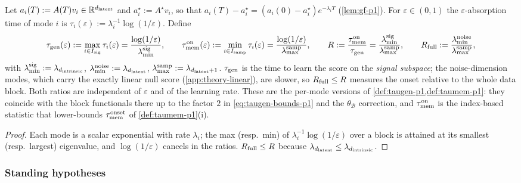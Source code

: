 \begin{definition}\label{def:abs-times-buf}
Let $a_i(T):=A(T)v_i\in\mathbb{R}^{d_{\mathrm{latent}}}$ and $a_i^\star:=A^\star v_i$, so that $a_i(T)-a_i^\star=(a_i(0)-a_i^\star)e^{-\lambda_iT}$ (\cref{lem:gf-p1}). For $\varepsilon\in(0,1)$ the $\varepsilon$-absorption time of mode $i$ is $\tau_i(\varepsilon):=\lambda_i^{-1}\log(1/\varepsilon)$. Define
\begin{equation}
\tau_{\mathrm{gen}}(\varepsilon):=\max_{i\in I_{\rm sig}}\tau_i(\varepsilon)=\frac{\log(1/\varepsilon)}{\lambda^{\rm sig}_{\min}},\qquad
\tau_{\mathrm{mem}}^{\rm on}(\varepsilon):=\min_{i\in I_{\rm samp}}\tau_i(\varepsilon)=\frac{\log(1/\varepsilon)}{\lambda^{\rm samp}_{\max}},\qquad
R:=\frac{\tau_{\mathrm{mem}}^{\rm on}}{\tau_{\mathrm{gen}}}=\frac{\lambda^{\rm sig}_{\min}}{\lambda^{\rm samp}_{\max}},\qquad
R_{\rm full}:=\frac{\lambda^{\rm noise}_{\min}}{\lambda^{\rm samp}_{\max}},
\label{eq:def-R-buf}
\end{equation}
with $\lambda^{\rm sig}_{\min}:=\lambda_{d_{\mathrm{intrinsic}}}$, $\lambda^{\rm noise}_{\min}:=\lambda_{d_{\mathrm{latent}}}$, $\lambda^{\rm samp}_{\max}:=\lambda_{d_{\mathrm{latent}}+1}$. $\tau_{\mathrm{gen}}$ is the time to learn the score on the \emph{signal subspace}; the noise-dimension modes, which carry the exactly linear null score (\cref{app:theory-linear}), are slower, so $R_{\rm full}\le R$ measures the onset relative to the whole data block. Both ratios are independent of $\varepsilon$ and of the learning rate. These are the per-mode versions of \cref{def:taugen-p1,def:taumem-p1}: they coincide with the block functionals there up to the factor $2$ in \eqref{eq:taugen-bounds-p1} and the $\theta_{\mathcal B}$ correction, and $\tau_{\mathrm{mem}}^{\rm on}$ is the index-based statistic that lower-bounds $\tau_{\mathrm{mem}}^{\rm onset}$ of \cref{def:taumem-p1}(i).
\end{definition}
\begin{proof}
Each mode is a scalar exponential with rate $\lambda_i$; the max (resp.\ min) of $\lambda_i^{-1}\log(1/\varepsilon)$ over a block is attained at its smallest (resp.\ largest) eigenvalue, and $\log(1/\varepsilon)$ cancels in the ratios. $R_{\rm full}\le R$ because $\lambda_{d_{\mathrm{latent}}}\le\lambda_{d_{\mathrm{intrinsic}}}$.
\end{proof}

\subsubsection{Standing hypotheses}


